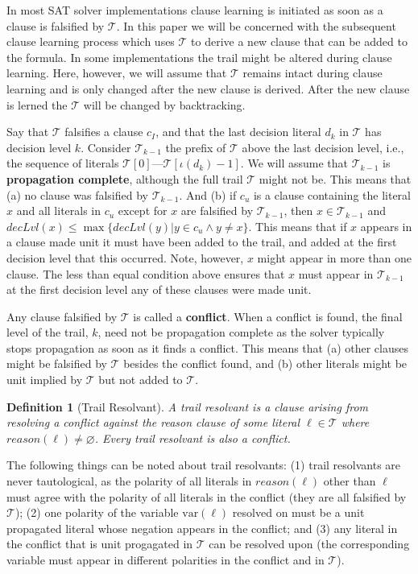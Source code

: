 \documentclass[runningheads]{llncs}
\newcommand{\sat}{SAT\xspace}
\newcommand{\trail}{\ensuremath{\mathcal{T}}}
\newcommand{\trailIdx}[1]{\ensuremath{\iota(#1)}}
\newcommand{\dlevel}[1]{\ensuremath{\mathit{decLvl}(#1)}}
\newcommand{\var}{\text{var}}
\newcommand{\reason}[1]{\ensuremath{\mathit{reason}(#1)}}
\newtheorem{defn}{Definition}
\begin{document}
In most \sat solver implementations clause learning is initiated as
soon as a clause is falsified by $\trail$. In this paper we will be
concerned with the subsequent clause learning process which uses
$\trail$ to derive a new clause that can be added to the formula. In
some implementations the trail might be altered during clause
learning. Here, however, we will assume that $\trail$ remains intact
during clause learning and is only changed after the new clause is
derived. After the new clause is lerned the $\trail$ will be changed by backtracking.

Say that $\trail$ falsifies a clause $c_I$, and that the last decision
literal $d_k$ in $\trail$ has decision level $k$. Consider
$\trail_{k-1}$ the prefix of $\trail$ above the last decision level,
i.e., the sequence of literals
$\trail[0]$---$\trail[\trailIdx{d_k}-1]$. We will assume that
$\trail_{k-1}$ is \textbf{propagation complete}, although the full
trail $\trail$ might not be. This means that (a) no clause was
falsified by $\trail_{k-1}$. And (b) if $c_u$ is a clause containing
the literal $x$ and all literals in $c_u$ except for $x$ are falsified
by $\trail_{k-1}$, then $x\in \trail_{k-1}$ and
$\dlevel{x} \leq\max\{\dlevel{y} | y\in c_u \land y\neq x\}$. This
means that if $x$ appears in a clause made unit it must have been
added to the trail, and added at the first decision level that this
occurred.  Note, however, $x$ might appear in more than one clause.
The less than equal condition above ensures that $x$ must appear in
$\trail_{k-1}$ at the first decision level any of these clauses were
made unit.

Any clause falsified by $\trail$ is called a \textbf{conflict}. When a
conflict is found, the final level of the trail, $k$, need not be
propagation complete as the solver typically stops propagation as soon
as it finds a conflict. This means that (a) other clauses might be
falsified by $\trail$ besides the conflict found, and (b) other
literals might be unit implied by $\trail$ but not added to $\trail$.

\begin{defn}[Trail Resolvant]
    A trail resolvant is a clause arising from resolving a conflict
    against the reason clause of some literal $\ell \in \trail$ where
    $\reason{\ell}\neq \varnothing$. Every trail resolvant is also a
    conflict.
\end{defn}

The following things can be noted about trail resolvants: (1) trail
resolvants are never tautological, as the polarity of all literals in
$\reason{\ell}$ other than $\ell$ must agree with the polarity of all
literals in the conflict (they are all falsified by $\trail$); (2) one
polarity of the variable $\var(\ell)$ resolved on must be a unit
propagated literal whose negation appears in the conflict; and (3) any
literal in the conflict that is unit progagated in $\trail$ can be
resolved upon (the corresponding variable must appear in different
polarities in the conflict and in $\trail$).
\end{document}
